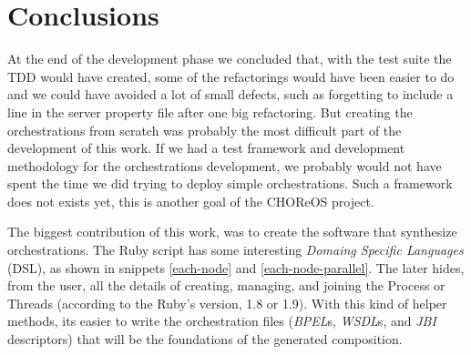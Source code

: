 \section{Conclusions}


At the end of the development phase we concluded that, with the test suite the TDD would have created, some of the refactorings would have been easier to do and we could have avoided a lot of small defects, such as forgetting to include a line in the server property file after one big refactoring. But creating the orchestrations from scratch was probably the most difficult part of the development of this work. If we had a test framework and development methodology for the orchestrations development, we probably would not have spent the time we did trying to deploy simple orchestrations. Such a framework does not exists yet, this is another goal of the CHOReOS project.

The biggest contribution of this work, was to create the software that synthesize orchestrations. The Ruby script has some interesting \emph{Domaing Specific Languages} (DSL), as shown in snippets \ref{each-node} and  \ref{each-node-parallel}. The later hides, from the user, all the details of creating, managing, and joining the Process or Threads (according to the Ruby's version, 1.8 or 1.9). With this kind of helper methods, its easier to write the orchestration files (\emph{BPEL}s, \emph{WSDL}s, and \emph{JBI} descriptors) that will be the foundations of the generated composition.




